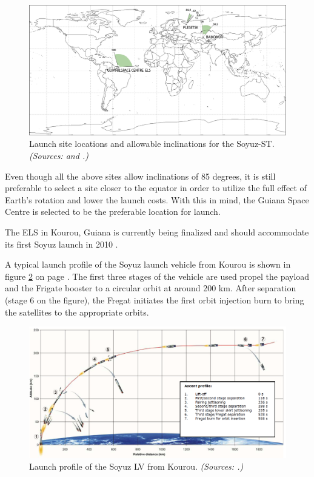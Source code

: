 \begin{figure}[ht!]
\centering
\includegraphics[width=1.0\textwidth, angle=0]{chapters/img/launchsites.png}
\caption{Launch site locations and allowable inclinations for the Soyuz-ST. \emph{(Sources: \cite{constDesign} and \cite{rockotman}.)} }
\label{fig:launchsites}
\end{figure}

Even though all the above sites allow inclinations of 85 degrees, it is still preferable to select a site closer to the equator in order to utilize the full effect of Earth's rotation and lower the launch costs. With this in mind, the Guiana Space Centre is selected to be the preferable location for launch.

The \ac{ELS} in Kourou, Guiana is currently being finalized and should accommodate its first Soyuz launch in 2010 \cite{arianesoyuz}.

A typical launch profile of the Soyuz launch vehicle from Kourou is shown in figure \ref{fig:launch} on page \pageref{fig:launch}. The first three stages of the vehicle are used propel the payload and the Frigate booster to a circular orbit at around 200 km. After separation (stage 6 on the figure), the Fregat initiates the first orbit injection burn to bring the satellites to the appropriate orbits.

\begin{figure}[ht]
\centering
\includegraphics[width=1.0\textwidth, angle=0]{chapters/img/launchprofile.png}
\caption{Launch profile of the Soyuz LV from Kourou. \emph{(Sources: \cite{soyuzman}.)} }
\label{fig:launch}
\end{figure}

